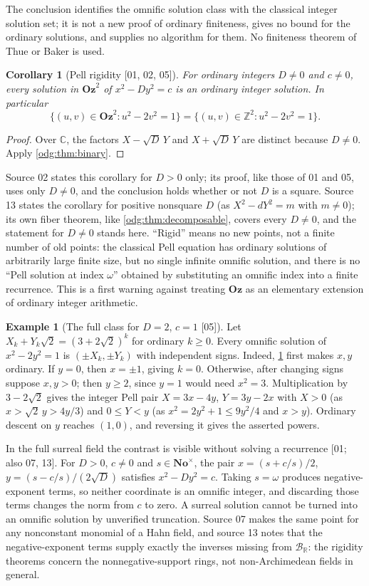 \documentclass[11pt,oneside]{article}
\numberwithin{equation}{section}
\newtheorem{corollary}[corollary]{Corollary}
\theoremstyle{definition}
\newtheorem{example}[example]{Example}
\theoremstyle{remark}
\newcommand{\No}{\mathbf{No}}
\newcommand{\Oz}{\mathbf{Oz}}
\newcommand{\Z}{\mathbb Z}
\newcommand{\R}{\mathbb R}
\newcommand{\C}{\mathbb C}
\newcommand{\BR}{\mathcal B_{\R}}
\newcommand{\src}[1]{\textup{\textsf{\small[#1]}}}
\begin{document}
The conclusion identifies the omnific solution class with the classical
integer solution set; it is not a new proof of ordinary finiteness, gives no
bound for the ordinary solutions, and supplies no algorithm for them. No
finiteness theorem of Thue or Baker is used.

\begin{corollary}[Pell rigidity \src{01, 02, 05}]\label{odg:cor:pell}
For ordinary integers $D\ne0$ and $c\ne0$, every solution in $\Oz^2$ of
$x^2-Dy^2=c$ is an ordinary integer solution. In particular
\[
 \{(u,v)\in\Oz^2:u^2-2v^2=1\}=\{(u,v)\in\Z^2:u^2-2v^2=1\}.
\]
\end{corollary}
\begin{proof}
Over $\C$, the factors $X-\sqrt D\,Y$ and $X+\sqrt D\,Y$ are distinct
because $D\ne0$. Apply \cref{odg:thm:binary}.
\end{proof}

Source 02 states this corollary for $D>0$ only; its proof, like those of 01
and 05, uses only $D\ne0$, and the conclusion holds whether or not $D$ is a
square. Source 13 states the corollary for positive nonsquare $D$ (as
$X^2-dY^2=m$ with $m\ne0$); its own fiber theorem, like
\cref{odg:thm:decomposable}, covers every $D\ne0$, and the statement for
$D\ne0$ stands here. ``Rigid'' means no new points, not a finite number of old points:
the classical Pell equation has ordinary solutions of arbitrarily large
finite size, but no single infinite omnific solution, and there is no ``Pell
solution at index $\omega$'' obtained by substituting an omnific index into a
finite recurrence. This is a first warning against treating $\Oz$ as an
elementary extension of ordinary integer arithmetic.

\begin{example}[The full class for $D=2$, $c=1$ \src{05}]\label{odg:ex:pell2}
Let $X_k+Y_k\sqrt2=(3+2\sqrt2)^k$ for ordinary $k\ge0$. Every omnific
solution of $x^2-2y^2=1$ is $(\pm X_k,\pm Y_k)$ with independent signs.
Indeed, \cref{odg:cor:pell} first makes $x,y$ ordinary. If $y=0$, then
$x=\pm1$, giving $k=0$. Otherwise, after changing signs suppose $x,y>0$;
then $y\ge2$, since $y=1$ would need $x^2=3$.
Multiplication by $3-2\sqrt2$ gives the integer Pell pair
$X=3x-4y$, $Y=3y-2x$ with $X>0$ (as $x>\sqrt2\,y>4y/3$) and $0\le Y<y$ (as
$x^2=2y^2+1\le9y^2/4$ and $x>y$). Ordinary descent on $y$ reaches $(1,0)$,
and reversing it gives the asserted powers.
\end{example}

In the full surreal field the contrast is visible without solving a
recurrence \src{01; also 07, 13}. For $D>0$, $c\ne0$ and $s\in\No^\times$, the pair
$x=(s+c/s)/2$, $y=(s-c/s)/(2\sqrt D)$ satisfies $x^2-Dy^2=c$. Taking
$s=\omega$ produces negative-exponent terms, so neither coordinate is an
omnific integer, and discarding those terms changes the norm from $c$ to
zero. A surreal solution cannot be turned into an omnific solution by
unverified truncation. Source 07 makes the same point for any nonconstant
monomial of a Hahn field, and source 13 notes that the negative-exponent terms
supply exactly the inverses missing from $\BR$: the rigidity theorems concern
the nonnegative-support rings, not non-Archimedean fields in general.
\end{document}
